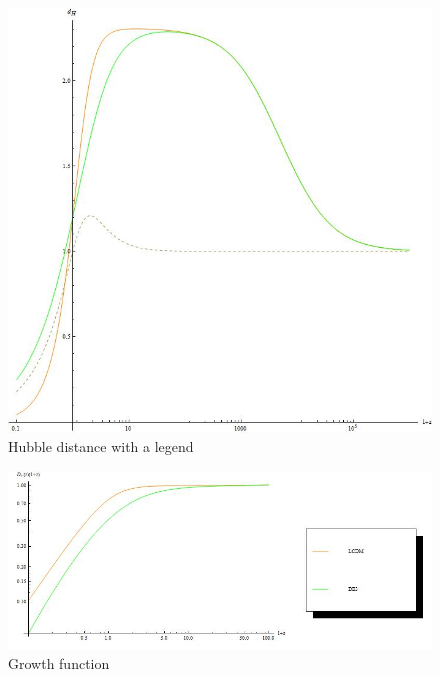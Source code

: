 \documentclass{article}
\begin{document}
\begin{figure}[!htbp]
\centering
\includegraphics[width=500pt]{DEs_HubbleDistance_Sync.jpg}
\caption{Hubble distance with a legend}\label{fig:DE_HubbleDistance2_Sync}
\end{figure}





\begin{figure}[!htbp]
\centering
\includegraphics[width=400pt]{DEs_GrowtheFunction_Sync.jpg}
\caption{Growth function}\label{fig:GrowthFunction_Sync}
\end{figure}
\end{document}
